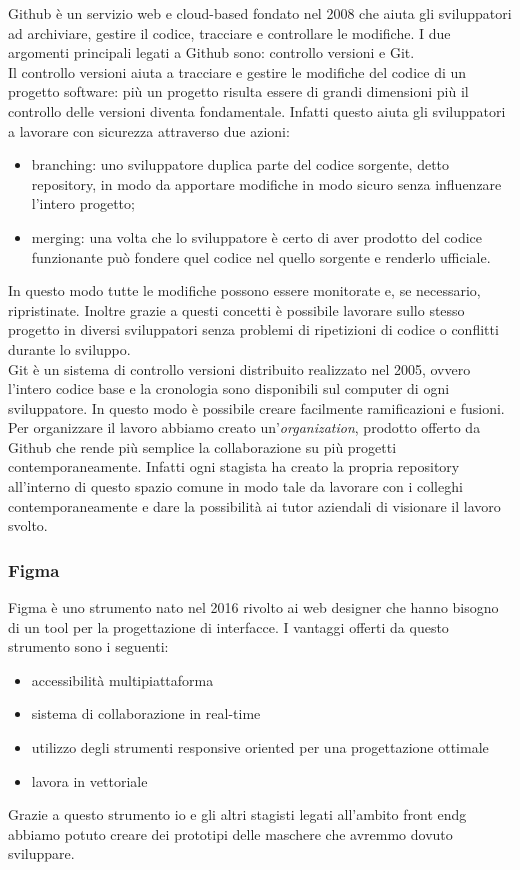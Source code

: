 Github è un servizio web e cloud-based fondato nel 2008 che aiuta gli sviluppatori ad archiviare, gestire il codice, tracciare e controllare le modifiche. I due argomenti principali legati a Github sono: controllo versioni e Git.\\
Il controllo versioni aiuta a tracciare e gestire le modifiche del codice di un progetto software: più un progetto risulta essere di grandi dimensioni più il controllo delle versioni diventa fondamentale. Infatti questo aiuta gli sviluppatori a lavorare con sicurezza attraverso due azioni:
\begin{itemize}
	\item branching: uno sviluppatore duplica parte del codice sorgente, detto repository, in modo da apportare modifiche in modo sicuro senza influenzare l'intero progetto;
	\item merging: una volta che lo sviluppatore è certo di aver prodotto del codice funzionante può fondere quel codice nel quello sorgente e renderlo ufficiale.
\end{itemize}
In questo modo tutte le modifiche possono essere monitorate e, se necessario, ripristinate. Inoltre grazie a questi concetti è possibile lavorare sullo stesso progetto in diversi sviluppatori senza problemi di ripetizioni di codice o conflitti durante lo sviluppo.\\
Git è un sistema di controllo versioni distribuito realizzato nel 2005, ovvero l'intero codice base e la cronologia sono disponibili sul computer di ogni sviluppatore. In questo modo è possibile creare facilmente ramificazioni e fusioni.\\
Per organizzare il lavoro abbiamo creato un'\textit{organization}, prodotto offerto da Github che rende più semplice la collaborazione su più progetti contemporaneamente. Infatti ogni stagista ha creato la propria repository all'interno di questo spazio comune in modo tale da lavorare con i colleghi contemporaneamente e dare la possibilità ai tutor aziendali di visionare il lavoro svolto.

\subsubsection{Figma}
\label{subsubsec:figma}

Figma è uno strumento nato nel 2016 rivolto ai web designer che hanno bisogno di un tool per la progettazione di interfacce. I vantaggi offerti da questo strumento sono i seguenti:
\begin{itemize}
	\item accessibilità multipiattaforma
	\item sistema di collaborazione in real-time
	\item utilizzo degli strumenti responsive oriented per una progettazione ottimale
	\item lavora in vettoriale
\end{itemize}
Grazie a questo strumento io e gli altri stagisti legati all'ambito \gls{front endg} abbiamo potuto creare dei prototipi delle maschere che avremmo dovuto sviluppare.

